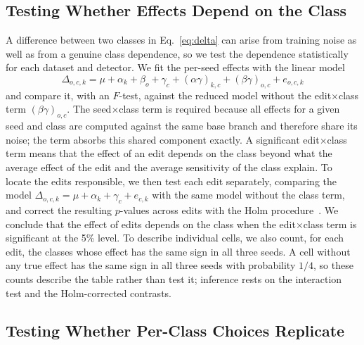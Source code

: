 \documentclass[conference]{IEEEtran}
\begin{document}
\subsection{Testing Whether Effects Depend on the Class}
\label{sec:measure_tests}

A difference between two classes in Eq.~\eqref{eq:delta} can arise from training noise as well as from a genuine class dependence, so we test the dependence statistically for each dataset and detector. We fit the per-seed effects with the linear model
\begin{equation}
\Delta_{o,c,k}=\mu+\alpha_k+\beta_o+\gamma_c+(\alpha\gamma)_{k,c}+(\beta\gamma)_{o,c}+e_{o,c,k}
\label{eq:anova}
\end{equation}
and compare it, with an $F$-test, against the reduced model without the edit$\times$class term $(\beta\gamma)_{o,c}$. The seed$\times$class term is required because all effects for a given seed and class are computed against the same base branch and therefore share its noise; the term absorbs this shared component exactly. A significant edit$\times$class term means that the effect of an edit depends on the class beyond what the average effect of the edit and the average sensitivity of the class explain. To locate the edits responsible, we then test each edit separately, comparing the model $\Delta_{o,c,k}=\mu+\alpha_k+\gamma_c+e_{c,k}$ with the same model without the class term, and correct the resulting $p$-values across edits with the Holm procedure~\cite{holm1979}. We conclude that the effect of edits depends on the class when the edit$\times$class term is significant at the 5\% level. To describe individual cells, we also count, for each edit, the classes whose effect has the same sign in all three seeds. A cell without any true effect has the same sign in all three seeds with probability $1/4$, so these counts describe the table rather than test it; inference rests on the interaction test and the Holm-corrected contrasts.

\subsection{Testing Whether Per-Class Choices Replicate}
\label{sec:measure_crossfit}
\end{document}
